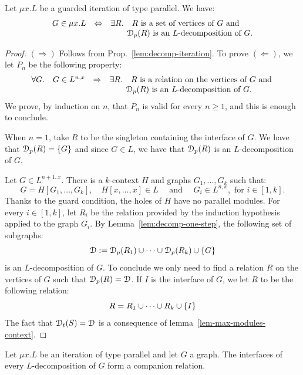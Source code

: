 \begin{proposition}\label{prop:decomp-iteration-parallel} Let  $\mu x. L$ be a guarded iteration of type parallel. We have:
$$\begin{array}{rll}
  G\in \mu x. L& \Leftrightarrow& \exists R.\quad  R \text{ is a set of vertices of $G$ and }\\
                      &             & \qquad \cD_\mathsf{p}(R) \text{ is an $L$-decomposition of $G$.} 
\end{array}
$$
\end{proposition}

\begin{proof} 
$(\Rightarrow)$ Follows from Prop.~\ref{lem:decomp-iteration}. To prove $(\Leftarrow)$, we let $P_n$ be the following property:
$$
\begin{array}{llll}
\forall G.\quad G\in L^{n,x}& \Rightarrow & \exists R.\quad  R \text{ is a relation on the vertices of $G$ and }\\  
&&  \qquad \cD_\mathsf{p}(R) \text{ is an $L$-decomposition of $G$.}
\end{array}
$$
We prove, by induction on $n$, that $P_n$ is valid for every $n\geq 1$, and this is enough to conclude. 
\smallskip

 When $n=1$, take $R$ to be the singleton containing the interface of $G$. We have that $\cD_\mathsf{p}(R)=\set{G}$ and since $G\in L$, we have that $\cD_\mathsf{p}(R)$ is an $L$-decomposition of $G$.
\medskip

 Let $G\in L^{n+1,x}$. There is a $k$-context $H$ and  graphs $G_1, \dots, G_k$ such that: 
$$G=H[G_1,\dots, G_k],\quad H[x,\dots,x]\in L\quad \text{ and }\quad G_i\in L^{n,x}, \text{ for } i\in[1,k].$$ 
Thanks to the guard condition, the holes of $H$ have no parallel modules.  For every $i\in[1, k]$, let $R_i$ be the relation provided by the induction hypothesis applied to the graph $G_i$. By Lemma~\ref{lem:decomp-one-step}, the following set of subgraphs:
 $$\cD:=\cD_\mathsf{p}(R_1)\cup\dots\cup\cD_\mathsf{p}(R_k)\cup\set{G}$$
 is an $L$-decomposition of $G$. To conclude we only need to find a relation $R$ on the vertices of $G$ such that $\cD_\mathsf{p}(R)=\cD$. If $I$ is the interface of $G$, we let $R$ to be the following relation:
  $$R=R_1\cup\dots\cup R_k\cup\left\{I\right\}$$ 
  The fact that $\cD_\mathsf{t}(S)=\cD$ is a consequence of lemma~\ref{lem-max-modules-context}.
\end{proof}

\begin{proposition}\label{prop:interface-are-comp-parallel}
Let $\mu x. L$ be an iteration of type parallel and let $G$ a graph. The interfaces of every $L$-decomposition of $G$ form a companion relation.
\end{proposition}

